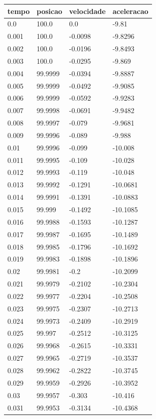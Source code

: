 \begin{tabular}{llll}
\toprule
tempo & posicao & velocidade & aceleracao \\
\midrule
0.0 & 100.0 & 0.0 & -9.81 \\
0.001 & 100.0 & -0.0098 & -9.8296 \\
0.002 & 100.0 & -0.0196 & -9.8493 \\
0.003 & 100.0 & -0.0295 & -9.869 \\
0.004 & 99.9999 & -0.0394 & -9.8887 \\
0.005 & 99.9999 & -0.0492 & -9.9085 \\
0.006 & 99.9999 & -0.0592 & -9.9283 \\
0.007 & 99.9998 & -0.0691 & -9.9482 \\
0.008 & 99.9997 & -0.079 & -9.9681 \\
0.009 & 99.9996 & -0.089 & -9.988 \\
0.01 & 99.9996 & -0.099 & -10.008 \\
0.011 & 99.9995 & -0.109 & -10.028 \\
0.012 & 99.9993 & -0.119 & -10.048 \\
0.013 & 99.9992 & -0.1291 & -10.0681 \\
0.014 & 99.9991 & -0.1391 & -10.0883 \\
0.015 & 99.999 & -0.1492 & -10.1085 \\
0.016 & 99.9988 & -0.1593 & -10.1287 \\
0.017 & 99.9987 & -0.1695 & -10.1489 \\
0.018 & 99.9985 & -0.1796 & -10.1692 \\
0.019 & 99.9983 & -0.1898 & -10.1896 \\
0.02 & 99.9981 & -0.2 & -10.2099 \\
0.021 & 99.9979 & -0.2102 & -10.2304 \\
0.022 & 99.9977 & -0.2204 & -10.2508 \\
0.023 & 99.9975 & -0.2307 & -10.2713 \\
0.024 & 99.9973 & -0.2409 & -10.2919 \\
0.025 & 99.997 & -0.2512 & -10.3125 \\
0.026 & 99.9968 & -0.2615 & -10.3331 \\
0.027 & 99.9965 & -0.2719 & -10.3537 \\
0.028 & 99.9962 & -0.2822 & -10.3745 \\
0.029 & 99.9959 & -0.2926 & -10.3952 \\
0.03 & 99.9957 & -0.303 & -10.416 \\
0.031 & 99.9953 & -0.3134 & -10.4368 \\

\end{tabular}
